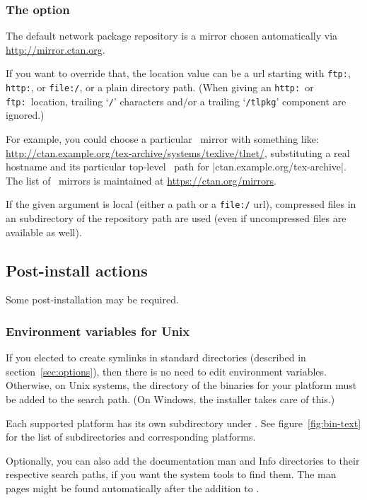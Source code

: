 \documentclass{article}
\begin{document}
\subsubsection{The  option}
\label{sec:location}

The default network package repository is a \CTAN{} mirror chosen
automatically via \url{http://mirror.ctan.org}.

If you want to override that, the location value can be a url starting
with \texttt{ftp:}, \texttt{http:}, or \texttt{file:/}, or a plain
directory path.  (When giving an \texttt{http:}\ or \texttt{ftp:}\
location, trailing `\texttt{/}' characters and/or a trailing
`\texttt{/tlpkg}' component are ignored.)

For example, you could choose a particular \CTAN\ mirror with something
like: \url{http://ctan.example.org/tex-archive/systems/texlive/tlnet/},
substituting a real hostname and its particular top-level \CTAN\ path
for |ctan.example.org/tex-archive|.  The list of \CTAN\ mirrors is
maintained at \url{https://ctan.org/mirrors}.

If the given argument is local (either a path or a \texttt{file:/} url),
compressed files in an \dirname{archive} subdirectory of the repository
path are used (even if uncompressed files are available as well).


\subsection{Post-install actions}
\label{sec:postinstall}

Some post-installation may be required.

\subsubsection{Environment variables for Unix}
\label{sec:env}

If you elected to create symlinks in standard directories (described in
section~\ref{sec:options}), then there is no need to edit environment
variables.  Otherwise, on Unix systems, the directory of the binaries
for your platform must be added to the search path.  (On Windows, the
installer takes care of this.)

Each supported platform has its own subdirectory under
. See figure~\ref{fig:bin-text} for the list of
subdirectories and corresponding platforms.

Optionally, you can also add the documentation man and Info directories
to their respective search paths, if you want the system tools to find
them.  The man pages might be found automatically after the addition to
\envname{PATH}.
\end{document}
